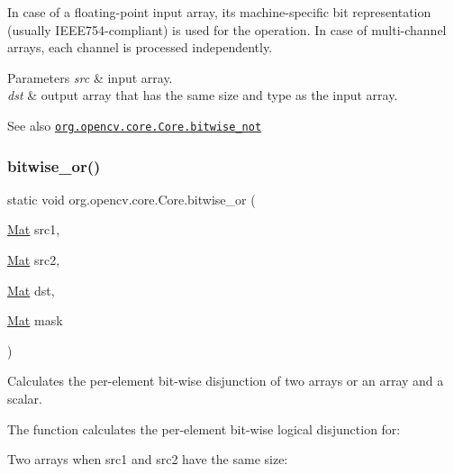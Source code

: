 In case of a floating-\/point input array, its machine-\/specific bit representation (usually I\+E\+E\+E754-\/compliant) is used for the operation. In case of multi-\/channel arrays, each channel is processed independently.


\begin{DoxyParams}{Parameters}
{\em src} & input array. \\
\hline
{\em dst} & output array that has the same size and type as the input array.\\
\hline
\end{DoxyParams}
\begin{DoxySeeAlso}{See also}
\href{http://docs.opencv.org/modules/core/doc/operations_on_arrays.html#bitwise-not}{\tt org.\+opencv.\+core.\+Core.\+bitwise\+\_\+not} 
\end{DoxySeeAlso}
\mbox{\label{classorg_1_1opencv_1_1core_1_1_core_a45c046e3bef54eeeacda2b09b4c953b4}} 
\subsubsection{\texorpdfstring{bitwise\+\_\+or()}{bitwise\_or()}\hspace{0.1cm}{\footnotesize\ttfamily [1/2]}}
{\footnotesize\ttfamily static void org.\+opencv.\+core.\+Core.\+bitwise\+\_\+or (\begin{DoxyParamCaption}\item[{\mbox{\hyperlink{classorg_1_1opencv_1_1core_1_1_mat}{Mat}}}]{src1,  }\item[{\mbox{\hyperlink{classorg_1_1opencv_1_1core_1_1_mat}{Mat}}}]{src2,  }\item[{\mbox{\hyperlink{classorg_1_1opencv_1_1core_1_1_mat}{Mat}}}]{dst,  }\item[{\mbox{\hyperlink{classorg_1_1opencv_1_1core_1_1_mat}{Mat}}}]{mask }\end{DoxyParamCaption})\hspace{0.3cm}{\ttfamily [static]}}

Calculates the per-\/element bit-\/wise disjunction of two arrays or an array and a scalar.

The function calculates the per-\/element bit-\/wise logical disjunction for\+:


\begin{DoxyItemize}
\item Two arrays when {\ttfamily src1} and {\ttfamily src2} have the same size\+: 
\end{DoxyItemize}

